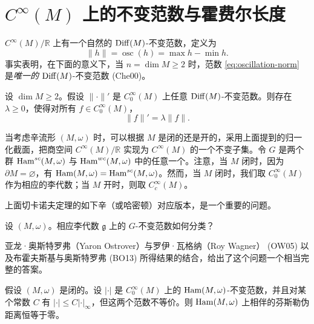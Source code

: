 \section{\texorpdfstring{$C^\infty(M)$}{C-infinity(M)} 上的不变范数与霍费尔长度}
\label{sec:invariant-norms-hofer-length}

$C^\infty(M)/\mathbb R$ 上有一个自然的 $\operatorname{Diff}(M)$-不变范数，定义为
\begin{equation}
 \|h\|=\operatorname{osc}(h)=\max h-\min h.
 \label{eq:oscillation-norm}
\end{equation}
事实表明，在下面的意义下，当 $n=\dim M\geq2$ 时，范数
\eqref{eq:oscillation-norm} 是\emph{唯一的} $\operatorname{Diff}(M)$-不变范数 (Che00)。

\begin{theorem}[切卡诺夫]\label{thm:chekanov-invariant-norm}
设 $\dim M\geq2$。假设 $\|\mathord\cdot\|'$ 是
$C_0^\infty(M)$ 上任意 $\operatorname{Diff}(M)$-不变范数。则存在 $\lambda\geq0$，使得对所有 $f\in C_0^\infty(M)$，
\[
 \|f\|'=\lambda\|f\|.
\]
\end{theorem}

当考虑辛流形 $(M,\omega)$ 时，可以根据 $M$ 是闭的还是开的，采用上面提到的归一化截面，把商空间 $C^\infty(M)/\mathbb R$ 实现为
$C^\infty(M)$ 的一个不变子集。令 $G$ 是两个群
$\operatorname{Ham}^{sc}(M,\omega)$ 与 $\operatorname{Ham}^{wc}(M,\omega)$ 中的任意一个。注意，当 $M$ 闭时，因为 $\partial M=\varnothing$，有
$\operatorname{Ham}(M,\omega)=\operatorname{Ham}^{sc}(M,\omega)$。然而，当 $M$ 闭时，我们取
$C_0^\infty(M)$ 作为相应的李代数；当 $M$ 开时，则取
$C_c^\infty(M)$。

上面切卡诺夫定理的如下辛（或哈密顿）对应版本，是一个重要的问题。

\begin{question}\label{q:classification-ham-invariant-norms}
设 $(M,\omega)$。相应李代数 $\mathfrak g$ 上的 $G$-不变范数如何分类？
\end{question}

亚龙·奥斯特罗弗（Yaron Ostrover）与罗伊·瓦格纳（Roy Wagner） (OW05) 以及布霍夫斯基与奥斯特罗弗 (BO13) 所得结果的结合，给出了这个问题一个相当完整的答案。

\begin{theorem}\label{thm:ostrover-wagner-pseudodistance}
假设 $(M,\omega)$ 是闭的。设 $|\mathord\cdot|$ 是
$C_0^\infty(M)$ 上的 $\operatorname{Ham}(M,\omega)$-不变范数，并且对某个常数
$C$ 有 $|\mathord\cdot|\leq C|\mathord\cdot|_\infty$，但这两个范数不等价。则 $\operatorname{Ham}(M,\omega)$ 上相伴的芬斯勒伪距离恒等于零。
\end{theorem}

